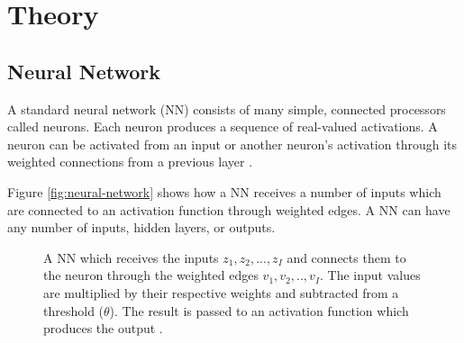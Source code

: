 \section{Theory}

\subsection{Neural Network}

A standard neural network (NN) consists of many simple, connected processors called neurons. Each neuron produces a sequence of real-valued activations. A neuron can be activated from an input or another neuron's activation through its weighted connections from a previous layer \cite{NeuralNetwork}.

Figure \ref{fig:neural-network} shows how a NN receives a number of inputs which are connected to an activation function through weighted edges. A NN can have any number of inputs, hidden layers, or outputs.

\begin{figure} \label{fig:neural-network}
\centering
{}
\caption{A NN which receives the inputs $z_1, z_2, ..., z_I$ and connects them to the neuron through the weighted edges $v_1, v_2, .., v_I$. The input values are multiplied by their respective weights and subtracted from a threshold ($\theta$). The result is passed to an activation function which produces the output \cite{Engelbrecht}.} \label{neural-network}
\end{figure}

